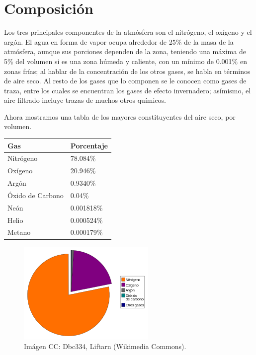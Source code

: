 \documentclass{article}
\begin{document}
\section{Composición}
Los tres principales componentes de la atmósfera son el nitrógeno, el oxígeno y el argón. El agua en forma de vapor ocupa alrededor de 25\% de la masa de la atmósfera, aunque sus porciones dependen de la zona, teniendo una máxima de 5\% del volumen si es una zona húmeda y caliente, con un mínimo de 0.001\% en zonas frías; al hablar de la concentración de los otros gases, se habla en términos de aire seco. Al resto de los gases que lo componen se le conocen como gases de traza, entre los cuales se encuentran los gases de efecto invernadero; asímismo, el aire filtrado incluye trazas de muchos otros químicos.

Ahora mostramos una tabla de los mayores constituyentes del aire seco, por volumen.
\begin{center}
    \begin{tabular}{ | l | l |}
    \hline
    \textbf{Gas}  & \textbf{Porcentaje}  \\ \hline
    Nitrógeno & 78.084\% \\ \hline
    Oxígeno & 20.946\% \\ \hline
    Argón & 0.9340\% \\ \hline
    Óxido de Carbono & 0.04\% \\ \hline
    Neón & 0.001818\% \\ \hline
    Helio & 0.000524\% \\ \hline
    Metano & 0.000179\% \\ \hline
    \end{tabular}
\end{center}

\begin{figure}[h]
  \centering
  \includegraphics[width=0.5\linewidth]{atmosfera2.png}
  \caption{Imágen CC: Dbc334, Liftarn (Wikimedia Commons).}
\end{figure}
\end{document}
